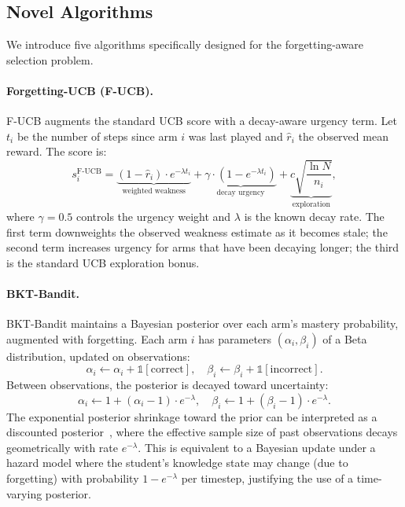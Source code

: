 \subsection{Novel Algorithms}
\label{sec:novel}

We introduce five algorithms specifically designed for the forgetting-aware selection problem.

\paragraph{Forgetting-UCB (F-UCB).}
F-UCB augments the standard UCB score with a decay-aware urgency term.
Let $t_i$ be the number of steps since arm $i$ was last played and $\hat{r}_i$ the observed mean reward.
The score is:
\begin{equation}
    s_i^{\text{F-UCB}} = \underbrace{(1 - \hat{r}_i) \cdot e^{-\lambda t_i}}_{\text{weighted weakness}} + \underbrace{\gamma \cdot (1 - e^{-\lambda t_i})}_{\text{decay urgency}} + \underbrace{c\sqrt{\frac{\ln N}{n_i}}}_{\text{exploration}},
    \label{eq:fucb}
\end{equation}
where $\gamma = 0.5$ controls the urgency weight and $\lambda$ is the known decay rate.
The first term downweights the observed weakness estimate as it becomes stale; the second term increases urgency for arms that have been decaying longer; the third is the standard UCB exploration bonus.

\paragraph{BKT-Bandit.}
BKT-Bandit maintains a Bayesian posterior over each arm's mastery probability, augmented with forgetting.
Each arm $i$ has parameters $(\alpha_i, \beta_i)$ of a Beta distribution, updated on observations:
\begin{equation}
    \alpha_i \leftarrow \alpha_i + \mathbb{1}[\text{correct}], \quad
    \beta_i \leftarrow \beta_i + \mathbb{1}[\text{incorrect}].
\end{equation}
Between observations, the posterior is decayed toward uncertainty:
\begin{equation}
    \alpha_i \leftarrow 1 + (\alpha_i - 1) \cdot e^{-\lambda}, \quad
    \beta_i \leftarrow 1 + (\beta_i - 1) \cdot e^{-\lambda}.
\end{equation}
The exponential posterior shrinkage toward the prior can be interpreted as a discounted posterior~\citep{raj2017taming}, where the effective sample size of past observations decays geometrically with rate $e^{-\lambda}$. This is equivalent to a Bayesian update under a hazard model where the student's knowledge state may change (due to forgetting) with probability $1 - e^{-\lambda}$ per timestep, justifying the use of a time-varying posterior.

